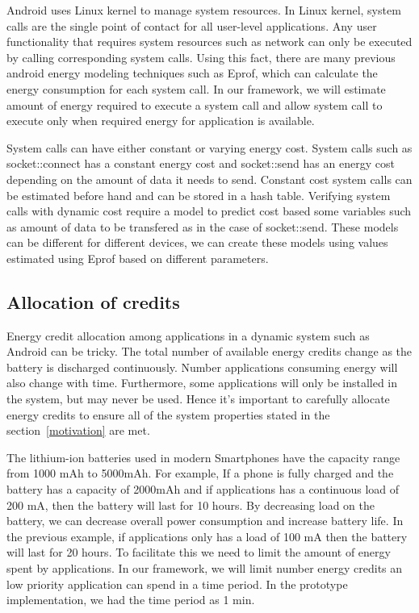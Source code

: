 Android uses Linux kernel to manage system resources. In Linux kernel, system calls are the single point of contact for all user-level applications. Any user functionality that requires system resources such as network can only be executed by calling corresponding system calls. Using this fact, there are many previous android energy modeling techniques such as Eprof, which can calculate the energy consumption for each system call. In our framework, we will estimate amount of energy required to execute a system call and allow system call to execute only when required energy for application is available.

System calls can have either constant or varying energy cost. System calls such as socket::connect has a constant energy cost and socket::send has an energy cost depending on the amount of data it needs to send. Constant cost system calls can be estimated before hand and can be stored in a hash table. Verifying system calls with dynamic cost require a model to predict cost based some variables such as amount of data to be transfered as in the case of socket::send. These models can be different for different devices, we can create these models using values estimated using Eprof based on different parameters.

\subsection{ Allocation of credits }

Energy credit allocation among applications in a dynamic system such as Android can be tricky. The total number of available energy credits change as the battery is discharged continuously. Number applications consuming energy will also change with time. Furthermore, some applications will only be installed in the system, but may never be used. Hence it's important to carefully allocate energy credits to ensure all of the system properties stated in the section~\ref{motivation}  are met.

The lithium-ion batteries used in modern Smartphones have the capacity range from 1000 mAh to 5000mAh. For example, If a phone is fully charged and the battery has a capacity of 2000mAh and if applications has a continuous load of 200 mA, then the battery will last for 10 hours. By decreasing load on the battery, we can decrease overall power consumption and increase battery life. In the previous example, if applications only has a load of 100 mA then the battery will last for 20 hours.  To facilitate this we need to limit the amount of energy spent by applications. In our framework, we will limit number energy credits an low priority application can spend in a time period. In the prototype implementation, we had the time period as 1 min.

